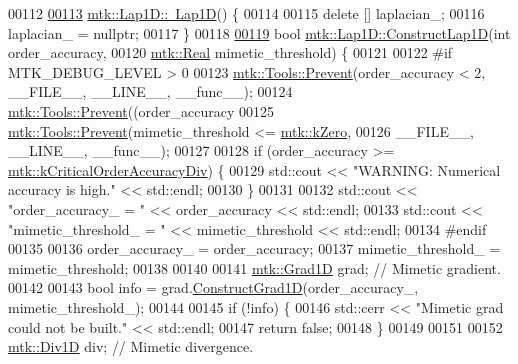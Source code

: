 \begin{DoxyCode}
00112 
\hypertarget{mtk__lap__1d_8cc_source_l00113}{}\hyperlink{classmtk_1_1Lap1D_ac0cb868243a66658cc46de5b818fa4e8}{00113} \hyperlink{classmtk_1_1Lap1D_ac0cb868243a66658cc46de5b818fa4e8}{mtk::Lap1D::~Lap1D}() \{
00114 
00115   \textcolor{keyword}{delete} [] laplacian\_;
00116   laplacian\_ = \textcolor{keyword}{nullptr};
00117 \}
00118 
\hypertarget{mtk__lap__1d_8cc_source_l00119}{}\hyperlink{classmtk_1_1Lap1D_a685dcba88c08cf5b7b6c2aa4669a472c}{00119} \textcolor{keywordtype}{bool} \hyperlink{classmtk_1_1Lap1D_a685dcba88c08cf5b7b6c2aa4669a472c}{mtk::Lap1D::ConstructLap1D}(\textcolor{keywordtype}{int} order\_accuracy,
00120                                 \hyperlink{group__c01-roots_gac080bbbf5cbb5502c9f00405f894857d}{mtk::Real} mimetic\_threshold) \{
00121 
00122 \textcolor{preprocessor}{  #if MTK\_DEBUG\_LEVEL > 0}
00123   \hyperlink{classmtk_1_1Tools_a332324c6f25e66be9dff48c5987a3b9f}{mtk::Tools::Prevent}(order\_accuracy < 2, \_\_FILE\_\_, \_\_LINE\_\_, \_\_func\_\_);
00124   \hyperlink{classmtk_1_1Tools_a332324c6f25e66be9dff48c5987a3b9f}{mtk::Tools::Prevent}((order\_accuracy%
00125   \hyperlink{classmtk_1_1Tools_a332324c6f25e66be9dff48c5987a3b9f}{mtk::Tools::Prevent}(mimetic\_threshold <= \hyperlink{group__c01-roots_ga59a451a5fae30d59649bcda274fea271}{mtk::kZero},
00126                       \_\_FILE\_\_, \_\_LINE\_\_, \_\_func\_\_);
00127 
00128   \textcolor{keywordflow}{if} (order\_accuracy >= \hyperlink{group__c01-roots_ga0898eef2108473e44a5223932d571c31}{mtk::kCriticalOrderAccuracyDiv}) \{
00129     std::cout << \textcolor{stringliteral}{"WARNING: Numerical accuracy is high."} << std::endl;
00130   \}
00131 
00132   std::cout << \textcolor{stringliteral}{"order\_accuracy\_ = "} << order\_accuracy << std::endl;
00133   std::cout << \textcolor{stringliteral}{"mimetic\_threshold\_ = "} << mimetic\_threshold << std::endl;
00134 \textcolor{preprocessor}{  #endif}
00135 
00136   order\_accuracy\_ = order\_accuracy;
00137   mimetic\_threshold\_ = mimetic\_threshold;
00138 
00140 
00141   \hyperlink{classmtk_1_1Grad1D}{mtk::Grad1D} grad; \textcolor{comment}{// Mimetic gradient.}
00142 
00143   \textcolor{keywordtype}{bool} info = grad.\hyperlink{classmtk_1_1Grad1D_a74ef5245cfae6fd158bd7f563a0c2e52}{ConstructGrad1D}(order\_accuracy\_, mimetic\_threshold\_);
00144 
00145   \textcolor{keywordflow}{if} (!info) \{
00146     std::cerr << \textcolor{stringliteral}{"Mimetic grad could not be built."} << std::endl;
00147     \textcolor{keywordflow}{return} \textcolor{keyword}{false};
00148   \}
00149 
00151 
00152   \hyperlink{classmtk_1_1Div1D}{mtk::Div1D} div; \textcolor{comment}{// Mimetic divergence.}

\end{DoxyCode}
